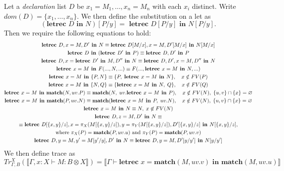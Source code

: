 \begin{example}
Let a \emph{declaration} list $D$ be $x_1 = M_1, \ldots, x_n = M_n$ with each $x_i$ distinct.
Write $dom(D) = \{x_1, \ldots, x_n \}$.
We then define the substitution on a let as
\[
(\textbf{letrec } D \textbf{ in } N) [P/y] = \textbf{ letrec } D[P/y] \textbf{ in } N[P/y].
\]
Then we require the following equations to hold:
\begin{subequations}\label{eq:let_equations}
\begin{gather}
\textbf{letrec } D, x = M, D' \textbf{ in } N  \equiv  \textbf{letrec } D[M/x], x = M, D'[M/x] \textbf{ in } N[M/x]\label{eq:let_equations:subst}\\
\textbf{letrec } D \textbf{ in } (\textbf{letrec } D' \textbf{ in } P) \equiv \textbf{letrec } D,D' \textbf{ in } P \label{eq:let_equations:merge_body}\\
\textbf{letrec } D, x = \textbf{letrec } D' \textbf{ in } M, D'' \textbf{ in } N \equiv \textbf{letrec } D,D',x = M, D'' \textbf{ in } N\label{eq:let_equations:merge_bind}\\
  \textbf{letrec } x = M \textbf{ in } F(..., N, ...) \equiv F(..., \textbf{letrec } x = M \textbf{ in } N, ...)\label{eq:let_equations:congruence}\\ 
  \textbf{letrec } x = M \textbf{ in } \{P, N\} \equiv \{P,\; \textbf{letrec } x = M \textbf{ in } N\},
    \quad x \notin FV(P) \label{eq:let_equations:float-tensor-R}\\
  \textbf{letrec } x = M \textbf{ in } \{N, Q\} \equiv \{\textbf{letrec } x = M \textbf{ in } N,\; Q\},
    \quad x \notin FV(Q) \label{eq:let_equations:float-tensor-L}\\
  \textbf{letrec } x = M \textbf{ in } \textbf{match}(N, uv.P) \equiv
    \textbf{match}(N,\; uv.\textbf{letrec } x = M \textbf{ in } P),
    \quad x \notin FV(N),\; \{u,v\}\cap\{x\}=\varnothing \label{eq:let_equations:float-match-body}\\
  \textbf{letrec } x = M \textbf{ in } \textbf{match}(P, uv.N) \equiv
    \textbf{match}(\textbf{letrec } x = M \textbf{ in } P,\; uv.N),
    \quad x \notin FV(N),\; \{u,v\}\cap\{x\}=\varnothing \label{eq:let_equations:float-match-scrutinee}\\
  \textbf{letrec } x = M \textbf{ in } N \equiv N,\;x \not \in FV(N)\label{eq:let_equations:gc}\\
\textbf{letrec } D, z = M, D' \textbf{ in } N \equiv\notag\\
\equiv \textbf{letrec } D[\{x,y\}/z], x = \pi_{X}(M[\{x,y\}/z]), y = \pi_{Y}(M[\{x,y\}/z]), D'[\{x,y\}/z] \textbf{ in } N[\{x,y\} / z],\notag\\
\text{where $\pi_{X}(P) = \textbf{match}(P, uv.u)$ and $\pi_{Y}(P) = \textbf{match}(P, uv.v)$}\label{eq:let_equations:unpair}\\
\textbf{letrec } D, y = M, y' = M[y'/y], D' \textbf{ in } N \equiv \textbf{letrec } D, y = M, D'[y/y'] \textbf{ in } N[y/y']\label{eq:let_equations:diag}
\end{gather}
\end{subequations}
We then define trace as
\[
Tr_{\Gamma,B}^{X}(\llbracket \Gamma, x : X \vdash M : B \otimes X \rrbracket) = \llbracket \Gamma \vdash \textbf{letrec } x = \textbf{match}(M, uv.v) \textbf{ in } \textbf{match}(M, uv.u) \rrbracket
\]



\end{example}
